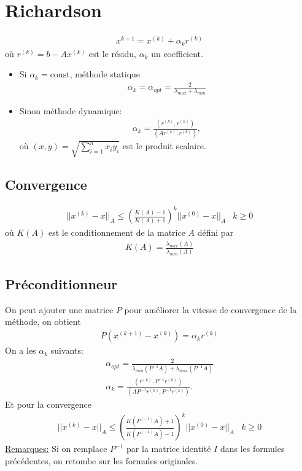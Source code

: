 \section{Richardson}
\begin{eqnarray}
	x^{k+1}=x^{(k)}+\alpha_k r^{(k)}
\end{eqnarray}
où $r^{(k)}=b-Ax^{(k)}$ est le résidu, $\alpha_k$ un coefficient.

\begin{itemize}
	\item Si $\alpha_k=\text{const}$, méthode statique
	\begin{eqnarray}
		\alpha_k=\alpha_{opt}=\frac{2}{\lambda_{max}+\lambda_{min}}
	\end{eqnarray}
	\item Sinon méthode dynamique: 
	\begin{eqnarray}
		\alpha_k=\frac{(r^{(k)},r^{(k)})}{(Ar^{(k)},r^{(k)})},
	\end{eqnarray}
	où $(x,y)=\sqrt{\sum_{i=1}^nx_iy_i}$ est le produit scalaire.
\end{itemize} 

\subsection{Convergence}
\begin{eqnarray}
	||x^{(k)}-x||_A\leq\left(\frac{K(A)-1}{K(A)+1}\right)^k||x^{(0)}-x||_A&k\geq0
\end{eqnarray}
où $K(A)$ est le conditionnement de la matrice $A$ défini par
\begin{eqnarray}
	K(A)=\frac{\lambda_{max}(A)}{\lambda_{min}(A)}
\end{eqnarray}

\subsection{Préconditionneur}
	On peut ajouter une matrice $P$ pour améliorer la vitesse de convergence de la méthode, on obtient
	\begin{eqnarray}
		P(x^{(k+1)}-x^{(k)})=\alpha_kr^{(k)}
	\end{eqnarray}
On a les $\alpha_k$ suivants:
\begin{eqnarray}
	\alpha_{opt}=\frac{2}{\lambda_{min}(P^{-1}A)+\lambda_{max}(P^{-1}A)}
	\\
	\alpha_k=\frac{(r^{(k)},P^{-1}r^{(k)})}{(AP^{-1}r^{(k)},P^{-1}r^{(k)})}.
\end{eqnarray}
Et pour la convergence
\begin{eqnarray}
	||x^{(k)}-x||_A\leq\left(\frac{K(P^{(-1)}A)+1}{K(P^{(-1)}A)-1}\right)^k||x^{(0)}-x||_A&k\geq0
\end{eqnarray}
\underline{Remarques:} Si on remplace $P^{-1}$ par la matrice identité $I$ dans les formules précédentes, on retombe sur les formules originales.
